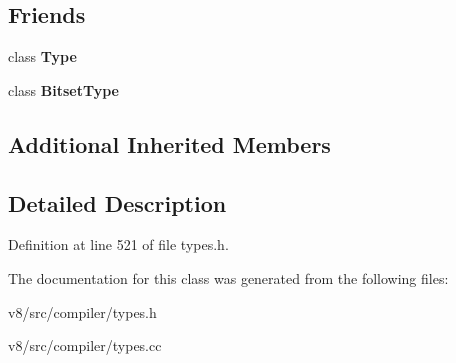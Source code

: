 \subsection*{Friends}
\begin{DoxyCompactItemize}
\item 
\mbox{\label{classv8_1_1internal_1_1compiler_1_1OtherNumberConstantType_a18dba29b4f3e91d6d2bc53472a6bb7cc}} 
class {\bfseries Type}
\item 
\mbox{\label{classv8_1_1internal_1_1compiler_1_1OtherNumberConstantType_ae1bc4470107e0fde432ac5e20204635d}} 
class {\bfseries Bitset\+Type}
\end{DoxyCompactItemize}
\subsection*{Additional Inherited Members}


\subsection{Detailed Description}


Definition at line 521 of file types.\+h.



The documentation for this class was generated from the following files\+:\begin{DoxyCompactItemize}
\item 
v8/src/compiler/types.\+h\item 
v8/src/compiler/types.\+cc\end{DoxyCompactItemize}
